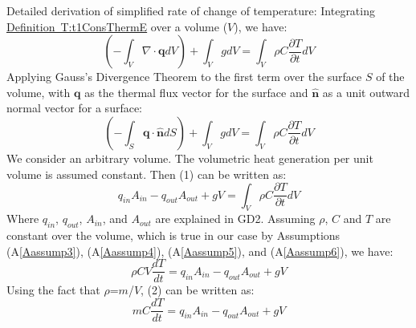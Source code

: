 \documentclass[12pt]{article}
\begin{document}
Detailed derivation of simplified rate of change of temperature:
Integrating \hyperref[T:t1ConsThermE]{Definition~T:t1ConsThermE} over a volume ($V$), we have:
\begin{equation}
\left(-\int_{V}{\nabla{}\cdot{}\mathbf{q}dV}\right)+\int_{V}{gdV}=\int_{V}{\rho{}C\frac{\partial{}T}{\partial{}t}dV}
\end{equation}
Applying Gauss's Divergence Theorem to the first term over the surface $S$ of the volume, with $\mathbf{q}$ as the thermal flux vector for the surface and $\mathbf{\hat{n}}$ as a unit outward normal vector for a surface:
\begin{equation}
\left(-\int_{S}{\mathbf{q}\cdot{}\mathbf{\hat{n}}dS}\right)+\int_{V}{gdV}=\int_{V}{\rho{}C\frac{\partial{}T}{\partial{}t}dV}
\end{equation}
We consider an arbitrary volume. The volumetric heat generation per unit volume is assumed constant. Then (1) can be written as:
\begin{equation}
q_{in}A_{in}-q_{out}A_{out}+gV=\int_{V}{\rho{}C\frac{\partial{}T}{\partial{}t}dV}
\end{equation}
Where $q_{in}$, $q_{out}$, $A_{in}$, and $A_{out}$ are explained in GD2. Assuming $\rho{}$, $C$ and $T$ are constant over the volume, which is true in our case by Assumptions (A\ref{Aassump3}), (A\ref{Aassump4}), (A\ref{Aassump5}), and (A\ref{Aassump6}), we have:
\begin{equation}
\rho{}CV\frac{dT}{dt}=q_{in}A_{in}-q_{out}A_{out}+gV
\end{equation}
Using the fact that $\rho{}$=$m$/$V$, (2) can be written as:
\begin{equation}
mC\frac{dT}{dt}=q_{in}A_{in}-q_{out}A_{out}+gV
\end{equation}
\end{document}
